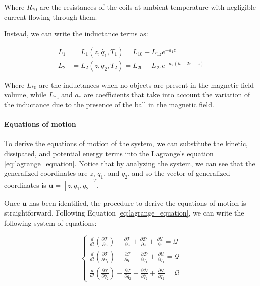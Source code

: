 Where $R_{*0}$ are the resistances of the coils at ambient temperature with negligible current flowing through them.

Instead, we can write the inductance terms as:

\begin{equation}
    \begin{aligned}
        L_1 & = L_1(z, \dot{q_1}, T_1) = L_{10} + L_{1z} e^{-a_1 z}            \\
        L_2 & = L_2(z, \dot{q_2}, T_2) = L_{20} + L_{2z} e^{-a_2 (h - 2r - z)}
    \end{aligned}
    \label{eq:model_for_inductance}
\end{equation}

Where $L_{*0}$ are the inductances when no objects are present in the magnetic field volume, while $L_{*z}$ and $a_*$ are coefficients that take into account the variation of the inductance due to the presence of the ball in the magnetic field.

\paragraph{Equations of motion}

To derive the equations of motion of the system, we can substitute the kinetic, dissipated, and potential energy terms into the Lagrange's equation \ref{eq:lagrange_equation}.
Notice that by analyzing the system, we can see that the generalized coordinates are $z$, $q_1$, and $q_2$, and so the vector of generalized coordinates is $\mathbf{u} = [z, q_1, q_2]^T$.

Once $\mathbf{u}$ has been identified, the procedure to derive the equations of motion is straightforward.
Following Equation \ref{eq:lagrange_equation}, we can write the following system of equations:

\begin{equation}
    \begin{cases}
        \frac{d}{dt} \left( \frac{\partial \mathcal{T}}{\partial \dot{z}} \right) - \frac{\partial \mathcal{T}}{\partial z} + \frac{\partial \mathcal{D}}{\partial \dot{z}} + \frac{\partial \mathcal{U}}{\partial z} = \mathcal{Q}         \\
        \frac{d}{dt} \left( \frac{\partial \mathcal{T}}{\partial \dot{q_1}} \right) - \frac{\partial \mathcal{T}}{\partial q_1} + \frac{\partial \mathcal{D}}{\partial \dot{q_1}} + \frac{\partial \mathcal{U}}{\partial q_1} = \mathcal{Q} \\
        \frac{d}{dt} \left( \frac{\partial \mathcal{T}}{\partial \dot{q_2}} \right) - \frac{\partial \mathcal{T}}{\partial q_2} + \frac{\partial \mathcal{D}}{\partial \dot{q_2}} + \frac{\partial \mathcal{U}}{\partial q_2} = \mathcal{Q}
    \end{cases}
\end{equation}

